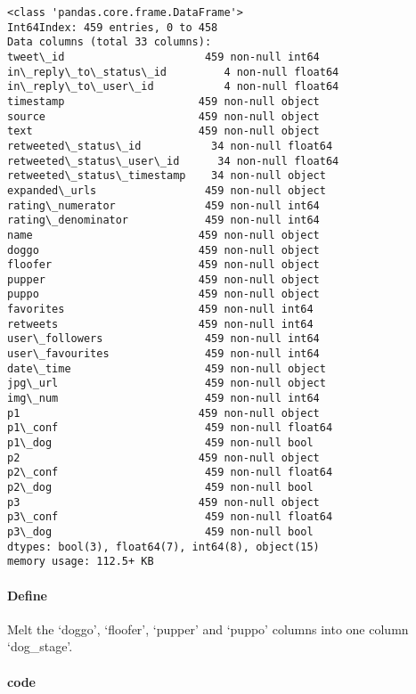 \documentclass[11pt]{article}
\begin{document}
    \begin{Verbatim}[commandchars=\\\{\}]
<class 'pandas.core.frame.DataFrame'>
Int64Index: 459 entries, 0 to 458
Data columns (total 33 columns):
tweet\_id                      459 non-null int64
in\_reply\_to\_status\_id         4 non-null float64
in\_reply\_to\_user\_id           4 non-null float64
timestamp                     459 non-null object
source                        459 non-null object
text                          459 non-null object
retweeted\_status\_id           34 non-null float64
retweeted\_status\_user\_id      34 non-null float64
retweeted\_status\_timestamp    34 non-null object
expanded\_urls                 459 non-null object
rating\_numerator              459 non-null int64
rating\_denominator            459 non-null int64
name                          459 non-null object
doggo                         459 non-null object
floofer                       459 non-null object
pupper                        459 non-null object
puppo                         459 non-null object
favorites                     459 non-null int64
retweets                      459 non-null int64
user\_followers                459 non-null int64
user\_favourites               459 non-null int64
date\_time                     459 non-null object
jpg\_url                       459 non-null object
img\_num                       459 non-null int64
p1                            459 non-null object
p1\_conf                       459 non-null float64
p1\_dog                        459 non-null bool
p2                            459 non-null object
p2\_conf                       459 non-null float64
p2\_dog                        459 non-null bool
p3                            459 non-null object
p3\_conf                       459 non-null float64
p3\_dog                        459 non-null bool
dtypes: bool(3), float64(7), int64(8), object(15)
memory usage: 112.5+ KB
    \end{Verbatim}

    \hypertarget{define}{%
\paragraph{Define}\label{define}}

Melt the `doggo', `floofer', `pupper' and `puppo' columns into one
column `dog\_stage'.

    \hypertarget{code}{%
\paragraph{code}\label{code}}
\end{document}

